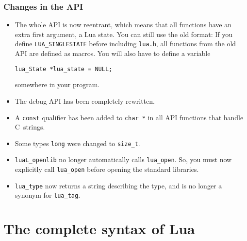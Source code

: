 \documentclass[11pt]{article}
\begin{document}
\subsubsection*{Changes in the API}
\begin{itemize}

\item
The whole API is now reentrant,
which means that all functions have
an extra first argument, a Lua state.
You can still use the old format:
If you define \verb|LUA_SINGLESTATE| before including \verb|lua.h|,
all functions from the old API are defined as macros.
You will also have to define a variable
\begin{verbatim}
lua_State *lua_state = NULL;
\end{verbatim}
somewhere in your program.

\item
The debug API has been completely rewritten.

\item
A \verb|const| qualifier has been added to \verb|char *|
in all API functions that handle C~strings.

\item
Some types \verb|long| were changed to \verb|size_t|.

\item
\verb|luaL_openlib| no longer automatically calls \verb|lua_open|.
So,
you must now explicitly call \verb|lua_open| before opening
the standard libraries.

\item
\verb|lua_type| now returns a string describing the type,
and is no longer a synonym for \verb|lua_tag|.

\end{itemize}

\section*{The complete syntax of Lua}

\renewenvironment{Produc}{\vspace{0.8ex}\par\noindent\hspace{3ex}\it\begin{tabular}{rrl}}{\end{tabular}\vspace{0.8ex}\par\noindent}

\renewcommand{\OrNL}{\\ & \Or & }
\end{document}
